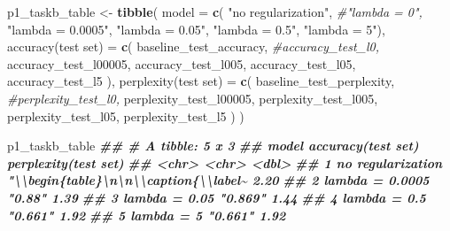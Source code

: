 \documentclass[
]{article}
\newenvironment{Shaded}{\begin{snugshade}}{\end{snugshade}}
\newcommand{\AttributeTok}[1]{\textcolor[rgb]{0.13,0.29,0.53}{#1}}
\newcommand{\CommentTok}[1]{\textcolor[rgb]{0.56,0.35,0.01}{\textit{#1}}}
\newcommand{\DocumentationTok}[1]{\textcolor[rgb]{0.56,0.35,0.01}{\textbf{\textit{#1}}}}
\newcommand{\FunctionTok}[1]{\textcolor[rgb]{0.13,0.29,0.53}{\textbf{#1}}}
\newcommand{\NormalTok}[1]{#1}
\newcommand{\OtherTok}[1]{\textcolor[rgb]{0.56,0.35,0.01}{#1}}
\newcommand{\StringTok}[1]{\textcolor[rgb]{0.31,0.60,0.02}{#1}}
\begin{document}
\begin{Shaded}
\begin{Highlighting}[]
\NormalTok{p1\_taskb\_table }\OtherTok{\textless{}{-}} 
  \FunctionTok{tibble}\NormalTok{(}
    \AttributeTok{model =} \FunctionTok{c}\NormalTok{(}
      \StringTok{"no regularization"}\NormalTok{,}
      \CommentTok{\#"lambda = 0",}
      \StringTok{"lambda = 0.0005"}\NormalTok{,}
      \StringTok{"lambda = 0.05"}\NormalTok{,}
      \StringTok{"lambda = 0.5"}\NormalTok{,}
      \StringTok{"lambda = 5"}\NormalTok{),}
    \StringTok{\textasciigrave{}}\AttributeTok{accuracy(test set)}\StringTok{\textasciigrave{}} \OtherTok{=} \FunctionTok{c}\NormalTok{(}
\NormalTok{      baseline\_test\_accuracy, }
      \CommentTok{\#accuracy\_test\_l0, }
\NormalTok{      accuracy\_test\_l00005,}
\NormalTok{      accuracy\_test\_l005,}
\NormalTok{      accuracy\_test\_l05,}
\NormalTok{      accuracy\_test\_l5}
\NormalTok{      ), }
    \StringTok{\textasciigrave{}}\AttributeTok{perplexity(test set)}\StringTok{\textasciigrave{}} \OtherTok{=} \FunctionTok{c}\NormalTok{(}
\NormalTok{      baseline\_test\_perplexity, }
      \CommentTok{\#perplexity\_test\_l0, }
\NormalTok{      perplexity\_test\_l00005,}
\NormalTok{      perplexity\_test\_l005,}
\NormalTok{      perplexity\_test\_l05,}
\NormalTok{      perplexity\_test\_l5}
\NormalTok{      )}
\NormalTok{  )}

\NormalTok{p1\_taskb\_table}
\DocumentationTok{\#\# \# A tibble: 5 x 3}
\DocumentationTok{\#\#   model             \textasciigrave{}accuracy(test set)\textasciigrave{}                  \textasciigrave{}perplexity(test set)\textasciigrave{}}
\DocumentationTok{\#\#   \textless{}chr\textgreater{}             \textless{}chr\textgreater{}                                                  \textless{}dbl\textgreater{}}
\DocumentationTok{\#\# 1 no regularization "\textbackslash{}\textbackslash{}begin\{table\}\textbackslash{}n\textbackslash{}n\textbackslash{}\textbackslash{}caption\{\textbackslash{}\textbackslash{}label\textasciitilde{}                   2.20}
\DocumentationTok{\#\# 2 lambda = 0.0005   "0.88"                                                  1.39}
\DocumentationTok{\#\# 3 lambda = 0.05     "0.869"                                                 1.44}
\DocumentationTok{\#\# 4 lambda = 0.5      "0.661"                                                 1.92}
\DocumentationTok{\#\# 5 lambda = 5        "0.661"                                                 1.92}




\end{Highlighting}
\end{Shaded}
\end{document}
